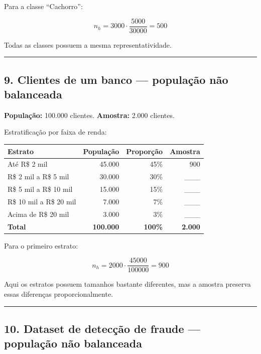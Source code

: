 \documentclass[
]{book}
\begin{document}
Para a classe ``Cachorro'':

\[
n_h= 3000\cdot\frac{5000}{30000} = 500
\]

Todas as classes possuem a mesma representatividade.

\begin{center}\rule{0.5\linewidth}{0.5pt}\end{center}

\subsection{9. Clientes de um banco --- população não balanceada}\label{clientes-de-um-banco-populauxe7uxe3o-nuxe3o-balanceada}

\textbf{População:} 100.000 clientes.
\textbf{Amostra:} 2.000 clientes.

Estratificação por faixa de renda:

\begin{longtable}[]{@{}lrrr@{}}
\toprule\noalign{}
Estrato & População & Proporção & Amostra \\
\midrule\noalign{}
\endhead
\bottomrule\noalign{}
\endlastfoot
Até R\$ 2 mil & 45.000 & 45\% & 900 \\
R\$ 2 mil a R\$ 5 mil & 30.000 & 30\% & \_\_\_ \\
R\$ 5 mil a R\$ 10 mil & 15.000 & 15\% & \_\_\_ \\
R\$ 10 mil a R\$ 20 mil & 7.000 & 7\% & \_\_\_ \\
Acima de R\$ 20 mil & 3.000 & 3\% & \_\_\_ \\
\textbf{Total} & \textbf{100.000} & \textbf{100\%} & \textbf{2.000} \\
\end{longtable}

Para o primeiro estrato:

\[
n_h = 2000\cdot\frac{45000}{100000} = 900
\]

Aqui os estratos possuem tamanhos bastante diferentes, mas a amostra preserva essas diferenças proporcionalmente.

\begin{center}\rule{0.5\linewidth}{0.5pt}\end{center}

\subsection{10. Dataset de detecção de fraude --- população não balanceada}\label{dataset-de-detecuxe7uxe3o-de-fraude-populauxe7uxe3o-nuxe3o-balanceada}
\end{document}
